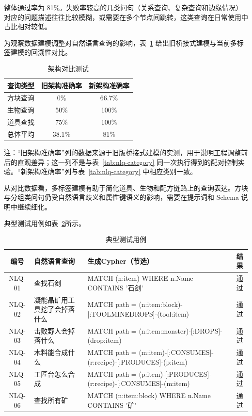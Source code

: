 \documentclass[12pt,a4paper]{article}
\begin{document}
整体通过率为 81\%。失败率较高的几类问句（关系查询、复杂查询和边缘情况）对应的问题描述往往比较模糊，或需要在多个节点间跳转，这类查询在日常使用中占比相对较低。

为观察数据建模调整对自然语言查询的影响，表~\ref{tab:arch-compare} 给出旧桥接式建模与当前多标签建模的回溯性对比。

\begin{table}[H]
    \centering
    \caption{架构对比测试}
    \label{tab:arch-compare}
    \begin{tabular}{lcc}
        \toprule
        \textbf{查询类型} & \textbf{旧架构准确率} & \textbf{新架构准确率} \\
        \midrule
        方块查询 & 0\% & 66.7\% \\
        生物查询 & 50\% & 100\% \\
        道具查找 & 75\% & 100\% \\
        总体平均 & 38.1\% & 81\% \\
        \bottomrule
    \end{tabular}
\end{table}
{\small 注：``旧架构准确率''列的数据来源于旧版桥接式建模的实测，用于说明工程调整前后的直观差异；这一列不是与表~\ref{tab:nlq-category} 同一次执行得到的配对控制实验。``新架构准确率''列与表~\ref{tab:nlq-category} 中相应类别一致。}

从对比数据看，多标签建模有助于简化道具、生物和配方链路上的查询表达。方块与分组类问句仍受自然语言歧义和属性键语义的影响，需要在提示词和 Schema 说明中继续细化。

典型测试用例如表~\ref{tab:nlq-cases}所示。

\begin{table}[H]
    \centering
    \caption{典型测试用例}
    \label{tab:nlq-cases}
    \small
    \setlength{\tabcolsep}{4pt}
    \begin{tabularx}{\textwidth}{@{}c>{\raggedright\arraybackslash}p{2.4cm}>{\ttfamily\footnotesize\raggedright\arraybackslash}Xc@{}}
        \toprule
        \textbf{编号} & \textbf{自然语言查询} & \textbf{生成Cypher（节选）} & \textbf{结果} \\
        \midrule
        NLQ-01 & 查找石剑 & MATCH (n:item) WHERE n.Name CONTAINS '石剑' & 通过 \\
        NLQ-02 & 凝能晶矿用工具挖了会掉落什么 & MATCH path = (n:item:block)-[:TOOLMINEDROPS]-(tool:item) & 通过 \\
        NLQ-03 & 击败野人会掉落什么 & MATCH path = (n:item:monster)-[:DROPS]-(drop:item) & 通过 \\
        NLQ-04 & 木料能合成什么 & MATCH path = (m:item)-[:CONSUMES]-(r:recipe)-[:PRODUCES]-(p:item) & 通过 \\
        NLQ-05 & 工匠台怎么合成 & MATCH path = (p:item)-[:PRODUCES]-(r:recipe)-[:CONSUMES]-(m:item) & 通过 \\
        NLQ-06 & 查找所有矿 & MATCH (n:item:block) WHERE n.Name CONTAINS '矿' & 通过 \\
        \bottomrule
    \end{tabularx}
\end{table}
\end{document}
